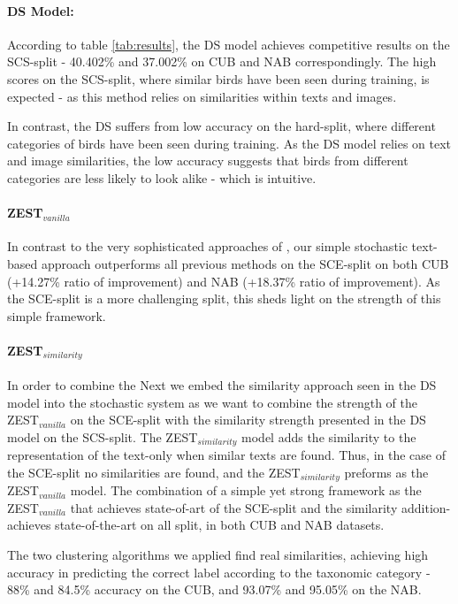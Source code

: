 \documentclass[11pt,a4paper]{article}
\begin{document}
\paragraph{DS Model:} 
According to table \ref{tab:results}, the DS model achieves competitive results on the SCS-split - 40.402\% and 37.002\% on CUB and NAB correspondingly. The high scores on the SCS-split, where similar birds have been seen during training, is expected - as this method relies on similarities within texts and images.\par

In contrast, the DS suffers from low accuracy on the hard-split, where different categories of birds have been seen  during training. As the DS model relies on text and image similarities, the low accuracy suggests that birds from different categories are less likely to look alike - which is intuitive. 

\paragraph{ZEST$_{vanilla}$}
In contrast to the very sophisticated approaches of \citet{zhu2018generative}, our simple stochastic text-based approach outperforms all previous methods on the SCE-split on both CUB (+14.27\% ratio of improvement) and NAB (+18.37\%  ratio of improvement). As the SCE-split is a more challenging split, this sheds light on the strength of this simple framework.  

\paragraph{ZEST$_{similarity}$}
In order to combine the
Next we embed the similarity approach seen in the DS model into the stochastic system as we want to combine the strength of the ZEST$_{vanilla}$ on the SCE-split with the similarity strength presented in the DS model on the SCS-split.
The ZEST$_{similarity}$ model adds the similarity to the representation of the text-only when similar texts are found. Thus, in the case of the SCE-split no similarities are found, and the ZEST$_{similarity}$ preforms as the ZEST$_{vanilla}$ model. 
The combination of a simple yet strong framework as the ZEST$_{vanilla}$ that achieves state-of-art of the SCE-split and the similarity addition- achieves state-of-the-art on all split, in both CUB and NAB datasets. \par


The two clustering algorithms we applied find real similarities, achieving high accuracy in predicting the correct label according to the taxonomic category - 88\% and 84.5\% accuracy on the CUB, and 93.07\% and 95.05\% on the NAB. 
\end{document}
